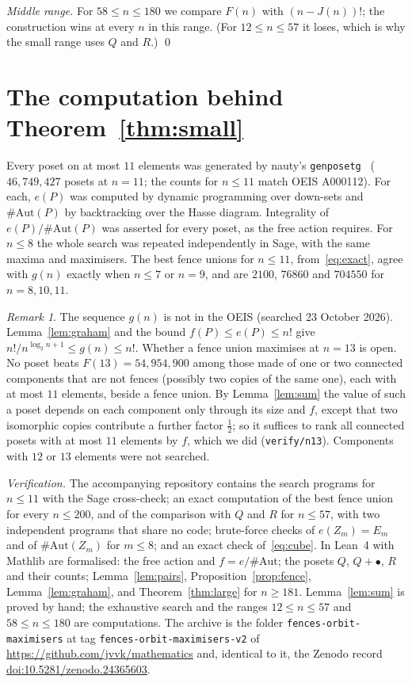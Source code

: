 \documentclass[11pt]{amsart}
\theoremstyle{remark}
\newtheorem{remark}{Remark}
\begin{document}
\emph{Middle range.} For $58\le n\le180$ we compare $F(n)$ with $(n-J(n))!$; the construction wins at every $n$ in this range. (For $12\le n\le57$ it loses, which is why the small range uses $Q$ and $R$.) \qed

\section{The computation behind Theorem~\ref{thm:small}}\label{sec:comp}

Every poset on at most $11$ elements was generated by nauty's \texttt{genposetg}~\cite{McK} ($46{,}749{,}427$ posets at $n=11$; the counts for $n\le11$ match OEIS A000112). For each, $e(P)$ was computed by dynamic programming over down-sets and $\#\mathrm{Aut}(P)$ by backtracking over the Hasse diagram. Integrality of $e(P)/\#\mathrm{Aut}(P)$ was asserted for every poset, as the free action requires. For $n\le8$ the whole search was repeated independently in Sage, with the same maxima and maximisers. The best fence unions for $n\le11$, from~\eqref{eq:exact}, agree with $g(n)$ exactly when $n\le7$ or $n=9$, and are $2100$, $76860$ and $704550$ for $n=8,10,11$.

\begin{remark}
The sequence $g(n)$ is not in the OEIS (searched 23 October 2026). Lemma~\ref{lem:graham} and the bound $f(P)\le e(P)\le n!$ give $n!/n^{\log_2n+1}\le g(n)\le n!$. Whether a fence union maximises at $n=13$ is open. No poset beats $F(13)=54{,}954{,}900$ among those made of one or two connected components that are not fences (possibly two copies of the same one), each with at most $11$ elements, beside a fence union. By Lemma~\ref{lem:sum} the value of such a poset depends on each component only through its size and $f$, except that two isomorphic copies contribute a further factor $\tfrac12$; so it suffices to rank all connected posets with at most $11$ elements by $f$, which we did (\texttt{verify/n13}). Components with $12$ or $13$ elements were not searched.
\end{remark}

\emph{Verification.} The accompanying repository contains the search programs for $n\le11$ with the Sage cross-check; an exact computation of the best fence union for every $n\le200$, and of the comparison with $Q$ and $R$ for $n\le57$, with two independent programs that share no code; brute-force checks of $e(Z_m)=E_m$ and of $\#\mathrm{Aut}(Z_m)$ for $m\le8$; and an exact check of~\eqref{eq:cube}. In Lean~4 with Mathlib are formalised: the free action and $f=e/\#\mathrm{Aut}$; the posets $Q$, $Q+\bullet$, $R$ and their counts; Lemma~\ref{lem:pairs}, Proposition~\ref{prop:fence}, Lemma~\ref{lem:graham}, and Theorem~\ref{thm:large} for $n\ge181$. Lemma~\ref{lem:sum} is proved by hand; the exhaustive search and the ranges $12\le n\le57$ and $58\le n\le180$ are computations. The archive is the folder \texttt{fences-orbit-maximisers} at tag \texttt{fences-orbit-maximisers-v2} of \url{https://github.com/jvvk/mathematics} and, identical to it, the Zenodo record \href{https://doi.org/10.5281/zenodo.24365603}{doi:10.5281/zenodo.24365603}.
\end{document}
